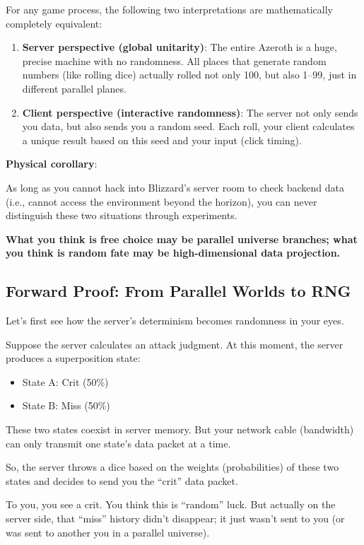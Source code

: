 For any game process, the following two interpretations are mathematically completely equivalent:

\begin{enumerate}
\item \textbf{Server perspective (global unitarity)}: The entire Azeroth is a huge, precise machine with no randomness. All places that generate random numbers (like rolling dice) actually rolled not only 100, but also 1--99, just in different parallel planes.

\item \textbf{Client perspective (interactive randomness)}: The server not only sends you data, but also sends you a random seed. Each roll, your client calculates a unique result based on this seed and your input (click timing).
\end{enumerate}

\textbf{Physical corollary}:

As long as you cannot hack into Blizzard's server room to check backend data (i.e., cannot access the environment beyond the horizon), you can never distinguish these two situations through experiments.

\textbf{What you think is free choice may be parallel universe branches; what you think is random fate may be high-dimensional data projection.}

\subsection{Forward Proof: From Parallel Worlds to RNG}

Let's first see how the server's determinism becomes randomness in your eyes.

Suppose the server calculates an attack judgment. At this moment, the server produces a superposition state:
\begin{itemize}
\item State A: Crit (50\%)
\item State B: Miss (50\%)
\end{itemize}

These two states coexist in server memory. But your network cable (bandwidth) can only transmit one state's data packet at a time.

So, the server throws a dice based on the weights (probabilities) of these two states and decides to send you the ``crit'' data packet.

To you, you see a crit. You think this is ``random'' luck. But actually on the server side, that ``miss'' history didn't disappear; it just wasn't sent to you (or was sent to another you in a parallel universe).

